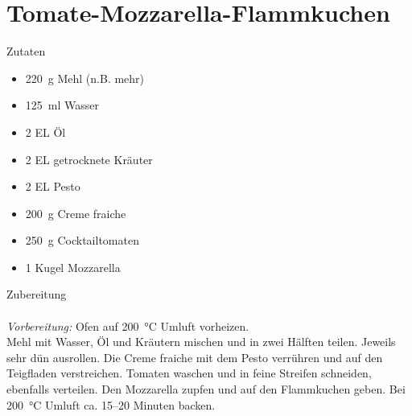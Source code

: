 \section*{Tomate-Mozzarella-Flammkuchen}
\ihead{}\ohead{}
\cfoot{}
{\Large Zutaten}
\begin{multicols}{2}
\begin{itemize}
    \item \SI{220}{g} Mehl (n.B. mehr)
    \item \SI{125}{ml} Wasser
    \item \num{2} EL Öl
    \item \num{2} EL getrocknete Kräuter
    \item \num{2} EL Pesto
    \item \SI{200}{g} Creme fraiche
    \item \SI{250}{g} Cocktailtomaten
    \item \num{1} Kugel Mozzarella
\end{itemize}
\end{multicols}
\noindent
{\Large Zubereitung}\\
\\
\textit{Vorbereitung:} Ofen auf \SI{200}{\celsius} Umluft vorheizen.\\
Mehl mit Wasser, Öl und Kräutern mischen und in zwei Hälften teilen.
Jeweils sehr dün ausrollen.
Die Creme fraiche mit dem Pesto verrühren und auf den Teigfladen verstreichen.
Tomaten waschen und in feine Streifen schneiden, ebenfalls verteilen.
Den Mozzarella zupfen und auf den Flammkuchen geben.
Bei \SI{200}{\celsius} Umluft ca. \numrange{15}{20} Minuten backen.